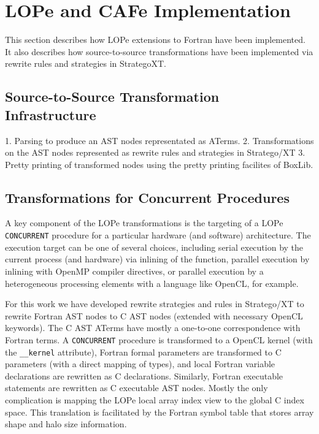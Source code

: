 \section{LOPe and CAFe Implementation}

This section describes how LOPe extensions to Fortran have been implemented.  It also describes how
source-to-source transformations have been implemented via rewrite rules and strategies in
StrategoXT.

\subsection{Source-to-Source Transformation Infrastructure}

1. Parsing to produce an AST nodes representated as ATerms.
2. Transformations on the AST nodes represented as rewrite rules and strategies in Stratego/XT
3. Pretty printing of transformed nodes using the pretty printing facilites of BoxLib.

\subsection{Transformations for Concurrent Procedures}

A key component of the LOPe transformations is the targeting of a LOPe \texttt{CONCURRENT}
procedure for a particular hardware (and software) architecture.  The execution target can be one
of several choices, including serial execution by the current process (and hardware) via inlining
of the function, parallel execution by inlining with OpenMP compiler directives, or parallel
execution by a heterogeneous processing elements with a language like OpenCL, for example.

For this work we have developed rewrite strategies and rules in Stratego/XT to rewrite Fortran AST
nodes to C AST nodes (extended with necessary OpenCL keywords).  The C AST ATerms have mostly a
one-to-one correspondence with Fortran terms.  A \texttt{CONCURRENT} procedure is transformed to a
OpenCL kernel (with the \texttt{\_\_kernel} attribute), Fortran formal parameters are transformed
to C parameters (with a direct mapping of types), and local Fortran variable declarations are rewritten
as C declarations.  Similarly, Fortran executable statements are rewritten as C executable AST nodes.
Mostly the only complication is mapping the LOPe local array index view to the global C index space.
This translation is facilitated by the Fortran symbol table that stores array shape and halo
size information.

